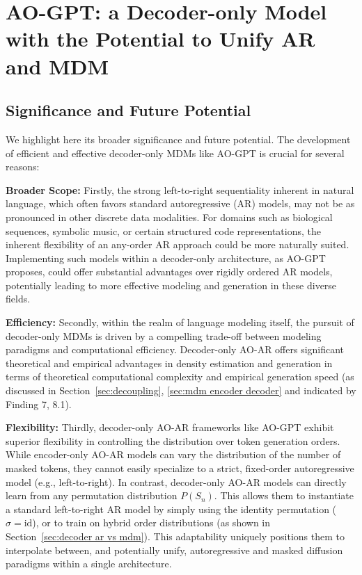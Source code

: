 

\section{AO-GPT: a Decoder-only Model with the Potential to Unify AR and MDM} 
\label{sec:model}

\subsection{Significance and Future Potential}
We highlight here its broader significance and future potential. The development of efficient and effective decoder-only MDMs like AO-GPT is crucial for several reasons:

\textbf{Broader Scope:} Firstly, the strong left-to-right sequentiality inherent in natural language, which often favors standard autoregressive (AR) models, may not be as pronounced in other discrete data modalities. For domains such as biological sequences, symbolic music, or certain structured code representations, the inherent flexibility of an any-order AR approach could be more naturally suited. Implementing such models within a decoder-only architecture, as AO-GPT proposes, could offer substantial advantages over rigidly ordered AR models, potentially leading to more effective modeling and generation in these diverse fields.

\textbf{Efficiency:} Secondly, within the realm of language modeling itself, the pursuit of decoder-only MDMs is driven by a compelling trade-off between modeling paradigms and computational efficiency. Decoder-only AO-AR offers significant theoretical and empirical advantages in density estimation and generation in terms of theoretical computational complexity and empirical generation speed (as discussed in Section~\ref{sec:decoupling}, \ref{sec:mdm encoder decoder} and indicated by Finding 7, 8.1).

\textbf{Flexibility:} Thirdly, decoder-only AO-AR frameworks like AO-GPT exhibit superior flexibility in controlling the distribution over token generation orders. While encoder-only AO-AR models can vary the distribution of the number of masked tokens, they cannot easily specialize to a strict, fixed-order autoregressive model (e.g., left-to-right). In contrast, decoder-only AO-AR models can directly learn from any permutation distribution $P(S_n)$. This allows them to instantiate a standard left-to-right AR model by simply using the identity permutation ($\sigma = \text{id}$), or to train on hybrid order distributions (as shown in Section~\ref{sec:decoder ar vs mdm}). This adaptability uniquely positions them to interpolate between, and potentially unify, autoregressive and masked diffusion paradigms within a single architecture.



